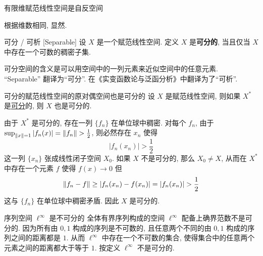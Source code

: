         \begin{ppt}
            {有限维赋范线性空间是自反空间}
        \end{ppt}

        \begin{prf}
            根据维数相同, 显然.
        \end{prf}

        \begin{dfn}
            [separable]
            {可分 / 可析}
            [Separable]
            设 \(X\) 是一个赋范线性空间. 定义 \(X\) 是\textbf{可分的}, 当且仅当 \(X\) 中存在一个可数的稠密子集.
        \end{dfn}

        \begin{rmk}
            [Dedicatia]
            可分空间的含义是可以用空间中的一列元素来近似空间中的任意元素. \\
            ``Separable'' 翻译为``可分''. 在《实变函数论与泛函分析》中翻译为了``可析''.
        \end{rmk}

        \begin{varthm}
            {可分的赋范线性空间的原对偶空间也是可分的}
            设 \(X\) 是赋范线性空间, 则如果 \(X^*\) 是\hyperref[dfn:separable]{可分}的, 则 \(X\) 也是可分的.
        \end{varthm}

        \begin{prf}
            由于 \(X^*\) 是可分的, 存在一列 \(\{f_n\}\) 在单位球中稠密. 对每个 \(f_n\), 由于 \(\sup_{\norm{x}=1}|f_n(x)|=\norm{f_n}>\frac{1}{2}\), 则必然存在 \(x_n\) 使得 
            \[|f_n(x_n)|>\frac{1}{2}\]
            这一列 \(\{x_n\}\) 张成线性闭子空间 \(X_0\). 如果 \(X\) 不是可分的, 那么 \(X_0\neq X\), 从而在 \(X^*\) 中存在一个元素 \(f\) 使得 \(f(x)\to 0\) 但 
            \[\norm{f_n-f}\geq|f_n(x_n)-f(x_n)|=|f_n(x_n)|>\frac{1}{2}\]
            这与 \(\{f_n\}\) 在单位球中稠密矛盾. 因此 \(X\) 是可分的.
        \end{prf}

        \begin{ins}
            {序列空间 \(\ell^\infty\) 是不可分的}
            全体有界序列构成的空间 \(\ell^\infty\) 配备上确界范数不是可分的. 因为所有由 \(0,1\) 构成的序列是不可数的, 且任意两个不同的由 \(0,1\) 构成的序列之间的距离都是 \(1\). 从而 \(\ell^\infty\) 中存在一个不可数的集合, 使得集合中的任意两个元素之间的距离都大于等于 \(1\). 按定义 \(\ell^\infty\) 不是可分的.
        \end{ins}

